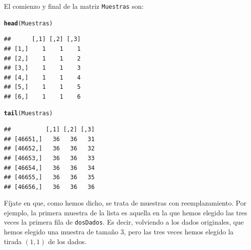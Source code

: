 \documentclass[10pt,a4paper]{article}\usepackage[]{graphicx}\usepackage[]{color}
\makeatletter
\newcommand{\hlstd}[1]{\textcolor[rgb]{0.345,0.345,0.345}{#1}}%
\newcommand{\hlkwd}[1]{\textcolor[rgb]{0.737,0.353,0.396}{\textbf{#1}}}%
\newenvironment{kframe}{%
 \def\at@end@of@kframe{}%
 \ifinner\ifhmode%
  \def\at@end@of@kframe{\end{minipage}}%
  \begin{minipage}{\columnwidth}%
 \fi\fi%
 \def\FrameCommand##1{\hskip\@totalleftmargin \hskip-\fboxsep
 \colorbox{shadecolor}{##1}\hskip-\fboxsep
     \hskip-\linewidth \hskip-\@totalleftmargin \hskip\columnwidth}%
 \MakeFramed {\advance\hsize-\width
   \@totalleftmargin\z@ \linewidth\hsize
   \@setminipage}}%
 {\par\unskip\endMakeFramed%
 \at@end@of@kframe}
\newenvironment{knitrout}{}{} %
\makeatother
\begin{document}
El comienzo y final de la matriz {\tt Muestras} son:
\begin{knitrout}
\color{fgcolor}\begin{kframe}
\begin{alltt}
\hlkwd{head}\hlstd{(Muestras)}
\end{alltt}
\begin{verbatim}
##      [,1] [,2] [,3]
## [1,]    1    1    1
## [2,]    1    1    2
## [3,]    1    1    3
## [4,]    1    1    4
## [5,]    1    1    5
## [6,]    1    1    6
\end{verbatim}
\begin{alltt}
\hlkwd{tail}\hlstd{(Muestras)}
\end{alltt}
\begin{verbatim}
##          [,1] [,2] [,3]
## [46651,]   36   36   31
## [46652,]   36   36   32
## [46653,]   36   36   33
## [46654,]   36   36   34
## [46655,]   36   36   35
## [46656,]   36   36   36
\end{verbatim}
\end{kframe}
\end{knitrout}
Fíjate en que, como hemos dicho, se trata de muestras con reemplazamiento. Por ejemplo, la primera muestra de la lista es aquella en la que hemos elegido las tres veces la primera fila de {\tt dosDados}. Es decir, volviendo a los dados originales, que hemos elegido una muestra de tamaño $3$, pero las tres veces hemos elegido la tirada $(1, 1)$ de los dados.
\end{document}
